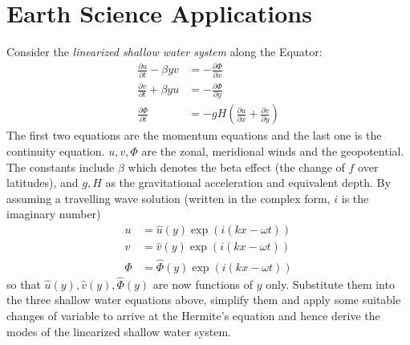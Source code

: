 \section{Earth Science Applications}

\begin{exmp}
Consider the \textit{linearized shallow water system} along the Equator:
\begin{align*}
\frac{\partial u}{\partial t} - \beta y v &= -\frac{\partial \Phi}{\partial x} \\
\frac{\partial v}{\partial t} + \beta y u &= -\frac{\partial \Phi}{\partial y} \\
\frac{\partial \Phi}{\partial t} &= - gH(\frac{\partial u}{\partial x} + \frac{\partial v}{\partial y})
\end{align*}
The first two equations are the momentum equations and the last one is the continuity equation. $u, v, \Phi$ are the zonal, meridional winds and the geopotential. The constants include $\beta$ which denotes the beta effect (the change of $f$ over latitudes), and $g,H$ as the gravitational acceleration and equivalent depth. By assuming a travelling wave solution (written in the complex form, $i$ is the imaginary number)
\begin{align*}
u &= \hat{u}(y)\exp(i(kx-\omega t)) \\
v &= \hat{v}(y)\exp(i(kx-\omega t)) \\
\Phi &= \hat{\Phi}(y)\exp(i(kx-\omega t))
\end{align*}
so that $\hat{u}(y), \hat{v}(y), \hat{\Phi}(y)$ are now functions of $y$ only. Substitute them into the three shallow water equations above, simplify them and apply some suitable changes of variable to arrive at the Hermite's equation and hence derive the modes of the linearized shallow water system.
\end{exmp}
